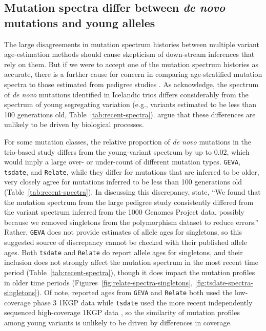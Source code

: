 \documentclass[]{article}
\newcommand{\GEVA}{\texttt{GEVA}\xspace}
\newcommand{\tsdate}{\texttt{tsdate}\xspace}
\newcommand{\relate}{\texttt{Relate}\xspace}
\begin{document}
\subsection*{Mutation spectra differ between \emph{de novo} mutations and young
alleles}

The large disagreements in mutation spectrum histories between multiple variant
age-estimation methods should cause skepticism of down-stream inferences that
rely on them. But if we were to accept one of the mutation spectrum histories
as accurate, there is a further cause for concern in comparing age-stratified
mutation spectra to those estimated from pedigree studies
\citep{jonsson2017parental,halldorsson2019characterizing}. As
\citet{wang2023human} acknowledge, the spectrum of \emph{de novo} mutations
identified in Icelandic trios \citep{jonsson2017parental} differs considerably
from the spectrum of young segregating variation (e.g., variants estimated to
be less than 100 generations old, Table~\ref{tab:recent-spectra}).
\citet{gao2022limited} argue that these differences are unlikely to be driven
by biological processes.

For some mutation classes, the relative proportion of \emph{de novo} mutations
in the trio-based study differs from the young-variant spectrum by up to
$0.02$, which would imply a large over- or under-count of different mutation
types. \GEVA, \tsdate, and \relate, while they differ for mutations that are
inferred to be older, very closely agree for mutations inferred to be less than
100 generations old (Table~\ref{tab:recent-spectra}). In discussing this
discrepancy, \citet{wang2023human} state, ``We found that the mutation spectrum
from the large pedigree study consistently differed from the variant spectrum
inferred from the 1000 Genomes Project data, possibly because we removed
singletons from the polymorphism dataset to reduce errors.'' Rather, \GEVA does
not provide estimates of allele ages for singletons, so this suggested source
of discrepancy cannot be checked with their published allele ages. Both \tsdate
and \relate do report allele ages for singletons, and their inclusion does not
strongly affect the mutation spectrum in the most recent time period
(Table~\ref{tab:recent-spectra}), though it does impact the mutation profiles
in older time periods (Figures~\ref{fig:relate-spectra-singletons},
\ref{fig:tsdate-spectra-singletons}). Of note, reported ages from \GEVA and
\relate both used the low-coverage phase 3 1KGP data while \tsdate used the
more recent independently sequenced high-coverage 1KGP data
\citep{byrska2022high}, so the similarity of mutation profiles among young
variants is unlikely to be driven by differences in coverage.
\end{document}
